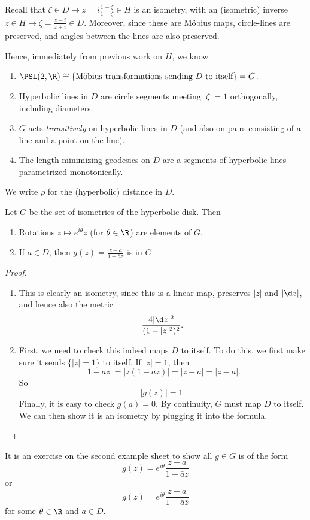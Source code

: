 \documentclass[a4paper]{article}
\begin{document}
Recall that $\zeta \in D \mapsto z = i\frac{1 + \zeta}{1 - \zeta} \in H$ is an isometry, with an (isometric) inverse $z \in H \mapsto \zeta = \frac{z - i}{z + i} \in D$. Moreover, since these are M\"obius maps, circle-lines are preserved, and angles between the lines are also preserved.

Hence, immediately from previous work on $H$, we know
\begin{enumerate}
  \item $\PSL(2, \R) \cong \{\text{M\"obius transformations sending $D$ to itself}\} = G$.
  \item Hyperbolic lines in $D$ are circle segments meeting $|\zeta| = 1$ orthogonally, including diameters.
  \item $G$ acts \emph{transitively} on hyperbolic lines in $D$ (and also on pairs consisting of a line and a point on the line).
  \item The length-minimizing geodesics on $D$ are a segments of hyperbolic lines parametrized monotonically.
\end{enumerate}

We write $\rho$ for the (hyperbolic) distance in $D$.

\begin{lemma}
  Let $G$ be the set of isometries of the hyperbolic disk. Then
  \begin{enumerate}
    \item Rotations $z \mapsto e^{i\theta}z$ (for $\theta \in \R$) are elements of $G$.
    \item If $a \in D$, then $g(z) = \frac{z - a}{1 - \bar{a} z}$ is in $G$.
  \end{enumerate}
\end{lemma}

\begin{proof}\leavevmode
  \begin{enumerate}
    \item This is clearly an isometry, since this is a linear map, preserves $|z|$ and $|\d z|$, and hence also the metric
      \[
        \frac{4 |\d z|^2}{(1 - |z|^2)^2}.
      \]
    \item First, we need to check this indeed maps $D$ to itself. To do this, we first make sure it sends $\{|z| = 1\}$ to itself. If $|z| = 1$, then
      \[
        |1 - \bar{a} z| = |\bar{z} (1 - \bar{a} z)| = |\bar{z} - \bar{a}| = |z - a|.
      \]
      So
      \[
        |g(z)| = 1.
      \]
      Finally, it is easy to check $g(a) = 0$. By continuity, $G$ must map $D$ to itself. We can then show it is an isometry by plugging it into the formula.
  \end{enumerate}
\end{proof}
It is an exercise on the second example sheet to show all $g \in G$ is of the form
\[
  g(z) = e^{i\theta} \frac{z - a}{1 - \bar{a} z}
\]
or
\[
  g(z) = e^{i\theta} \frac{\bar{z} - a}{1 - \bar{a} \bar{z}}
\]
for some $\theta \in \R$ and $a \in D$.
\end{document}
